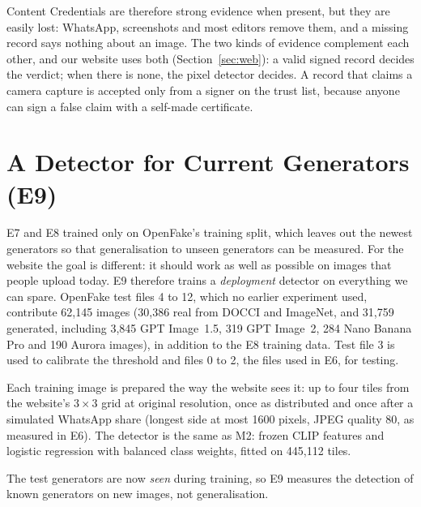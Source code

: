 \documentclass{mnnit}
\begin{document}
Content Credentials are therefore strong evidence when present, but they
are easily lost: WhatsApp, screenshots and most editors remove them, and
a missing record says nothing about an image. The two kinds of evidence
complement each other, and our website uses both
(Section~\ref{sec:web}): a valid signed record decides the verdict; when
there is none, the pixel detector decides. A record that claims a camera
capture is accepted only from a signer on the trust list, because anyone
can sign a false claim with a self-made certificate.

\section{A Detector for Current Generators (E9)}
\label{sec:e9}
E7 and E8 trained only on OpenFake's training split, which leaves out the
newest generators so that generalisation to unseen generators can be
measured. For the website the goal is different: it should work as well
as possible on images that people upload today. E9 therefore trains a
\emph{deployment} detector on everything we can spare. OpenFake test
files 4 to 12, which no earlier experiment used, contribute 62{,}145
images (30{,}386 real from DOCCI and ImageNet, and 31{,}759 generated,
including 3{,}845 GPT Image~1.5, 319 GPT Image~2, 284 Nano Banana Pro and
190 Aurora images), in addition to the E8 training data. Test file 3 is
used to calibrate the threshold and files 0 to 2, the files used in E6, for testing.

Each training image is prepared the way the website sees it: up to four
tiles from the website's $3\times3$ grid at original resolution, once as
distributed and once after a simulated WhatsApp share (longest side at
most 1600 pixels, JPEG quality 80, as measured in E6). The detector is
the same as M2: frozen CLIP features and logistic regression with
balanced class weights, fitted on 445{,}112 tiles.

The test generators are now \emph{seen} during training, so E9 measures
the detection of known generators on new images, not generalisation.
\end{document}
